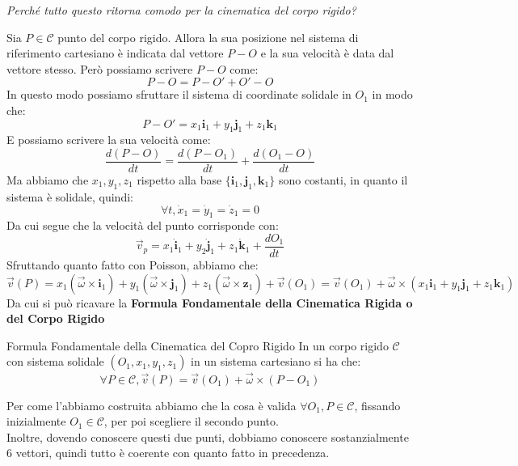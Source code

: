 \documentclass[11pt,a4paper,twoside]{article}
\theoremstyle{definition}
\begin{document}
\textit{Perché tutto questo ritorna comodo per la cinematica del corpo rigido?}
\begin{center}
\end{center}
Sia $P \in \mathscr C$ punto del corpo rigido. Allora la sua posizione nel sistema di riferimento cartesiano è indicata dal vettore $P-O$ e la sua velocità è data dal vettore stesso. Però possiamo scrivere $P-O$ come:
\[ P-O = P-O' + O'-O \]
In questo modo possiamo sfruttare il sistema di coordinate solidale in $O_1$ in modo che:
\[ P-O' = x_1 \mathbf i_1 + y_1 \mathbf j_1 + z_1 \mathbf k_1 \]
E possiamo scrivere la sua velocità come:
\[ \frac{d(P-O)}{dt} = \frac{d(P-O_1)}{dt} + \frac{d(O_1-O)}{dt} \]
Ma abbiamo che $x_1,y_1,z_1$ rispetto alla base $\{\mathbf i_1, \mathbf j_1, \mathbf k_1\}$ sono costanti, in quanto il sistema è solidale, quindi:
\[\forall t, \dot x_1 = \dot y_1 = \dot z_1 = 0\]
Da cui segue che la velocità del punto corrisponde con:
\[ \vec v_p = x_1 \dot{\mathbf i}_1 + y_2 \dot{\mathbf j}_1 + z_1 \dot{\mathbf k}_1 + \frac{dO_1}{dt} \]
Sfruttando quanto fatto con Poisson, abbiamo che:
\[ \vec v(P) = x_1(\vec \omega \times \mathbf i_1) + y_1(\vec \omega \times \mathbf j_1) + z_1(\vec \omega \times \mathbf z_1) + \vec v(O_1) = \vec v(O_1) + \vec \omega \times (x_1 \mathbf i_1 + y_1 \mathbf j_1 + z_1 \mathbf k_1)\]
Da cui si può ricavare la \textbf{Formula Fondamentale della Cinematica Rigida o del Corpo Rigido}

\begin{defn}{Formula Fondamentale della Cinematica del Copro Rigido}{}
	In un corpo rigido $\mathscr C$ con sistema solidale $(O_1, x_1, y_1, z_1)$ in un sistema cartesiano si ha che:
	\[ \forall P \in \mathscr C, \vec v(P) = \vec v(O_1) + \vec \omega \times (P-O_1)\]
\end{defn}

Per come l'abbiamo costruita abbiamo che la cosa è valida $\forall O_1, P \in \mathscr C$, fissando inizialmente $O_1 \in \mathscr C$, per poi scegliere il secondo punto.\\
Inoltre, dovendo conoscere questi due punti, dobbiamo conoscere sostanzialmente $6$ vettori, quindi tutto è coerente con quanto fatto in precedenza.
\end{document}
